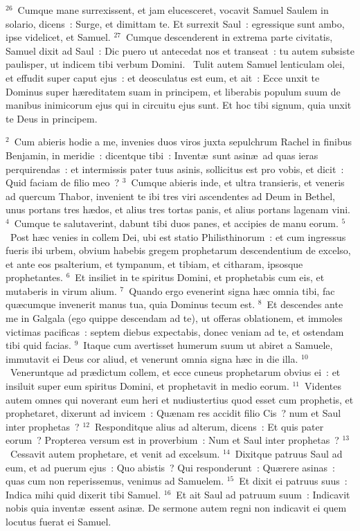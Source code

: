 ${}^{26}$~Cumque mane surrexissent, et jam elucesceret, vocavit Samuel Saulem in solario, dicens~: Surge, et dimittam te. Et surrexit Saul~: egressique sunt ambo, ipse videlicet, et Samuel.
${}^{27}$~Cumque descenderent in extrema parte civitatis, Samuel dixit ad Saul~: Dic puero ut antecedat nos et transeat~: tu autem subsiste paulisper, ut indicem tibi verbum Domini.
~Tulit autem Samuel lenticulam olei, et effudit super caput ejus~: et deosculatus est eum, et ait~: Ecce unxit te Dominus super h\ae reditatem suam in principem, et liberabis populum suum de manibus inimicorum ejus qui in circuitu ejus sunt. Et hoc tibi signum, quia unxit te Deus in principem.


${}^{2}$~Cum abieris hodie a me, invenies duos viros juxta sepulchrum Rachel in finibus Benjamin, in meridie~: dicentque tibi~: Invent\ae\ sunt asin\ae\ ad quas ieras perquirendas~: et intermissis pater tuus asinis, sollicitus est pro vobis, et dicit~: Quid faciam de filio meo~?
${}^{3}$~Cumque abieris inde, et ultra transieris, et veneris ad quercum Thabor, invenient te ibi tres viri ascendentes ad Deum in Bethel, unus portans tres h\ae dos, et alius tres tortas panis, et alius portans lagenam vini.
${}^{4}$~Cumque te salutaverint, dabunt tibi duos panes, et accipies de manu eorum.
${}^{5}$~Post h\ae c venies in collem Dei, ubi est statio Philisthinorum~: et cum ingressus fueris ibi urbem, obvium habebis gregem prophetarum descendentium de excelso, et ante eos psalterium, et tympanum, et tibiam, et citharam, ipsosque prophetantes.
${}^{6}$~Et insiliet in te spiritus Domini, et prophetabis cum eis, et mutaberis in virum alium.
${}^{7}$~Quando ergo evenerint signa h\ae c omnia tibi, fac qu\ae cumque invenerit manus tua, quia Dominus tecum est.
${}^{8}$~Et descendes ante me in Galgala (ego quippe descendam ad te), ut offeras oblationem, et immoles victimas pacificas~: septem diebus expectabis, donec veniam ad te, et ostendam tibi quid facias.
${}^{9}$~Itaque cum avertisset humerum suum ut abiret a Samuele, immutavit ei Deus cor aliud, et venerunt omnia signa h\ae c in die illa.
${}^{10}$~Veneruntque ad pr\ae dictum collem, et ecce cuneus prophetarum obvius ei~: et insiluit super eum spiritus Domini, et prophetavit in medio eorum.
${}^{11}$~Videntes autem omnes qui noverant eum heri et nudiustertius quod esset cum prophetis, et prophetaret, dixerunt ad invicem~: Qu\ae nam res accidit filio Cis~? num et Saul inter prophetas~?
${}^{12}$~Responditque alius ad alterum, dicens~: Et quis pater eorum~? Propterea versum est in proverbium~: Num et Saul inter prophetas~?
${}^{13}$~Cessavit autem prophetare, et venit ad excelsum.
${}^{14}$~Dixitque patruus Saul ad eum, et ad puerum ejus~: Quo abistis~? Qui responderunt~: Qu\ae rere asinas~: quas cum non reperissemus, venimus ad Samuelem.
${}^{15}$~Et dixit ei patruus suus~: Indica mihi quid dixerit tibi Samuel.
${}^{16}$~Et ait Saul ad patruum suum~: Indicavit nobis quia invent\ae\ essent asin\ae . De sermone autem regni non indicavit ei quem locutus fuerat ei Samuel.


